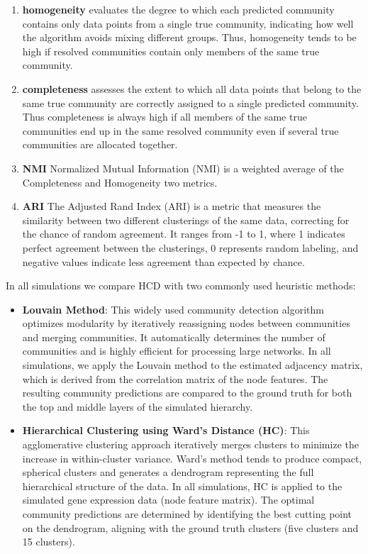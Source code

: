 \documentclass[
]{article}
\begin{document}
\begin{enumerate}
\def\labelenumi{\arabic{enumi}.}
\item
  \textbf{homogeneity} evaluates the degree to which each predicted
  community contains only data points from a single true community,
  indicating how well the algorithm avoids mixing different groups.
  Thus, homogeneity tends to be high if resolved communities contain
  only members of the same true community.
\item
  \textbf{completeness} assesses the extent to which all data points
  that belong to the same true community are correctly assigned to a
  single predicted community. Thus completeness is always high if all
  members of the same true communities end up in the same resolved
  community even if several true communities are allocated together.
\item
  \textbf{NMI} Normalized Mutual Information (NMI) is a weighted average
  of the Completeness and Homogeneity two metrics.
\item
  \textbf{ARI} The Adjusted Rand Index (ARI) is a metric that measures
  the similarity between two different clusterings of the same data,
  correcting for the chance of random agreement. It ranges from -1 to 1,
  where 1 indicates perfect agreement between the clusterings, 0
  represents random labeling, and negative values indicate less
  agreement than expected by chance.
\end{enumerate}

In all simulations we compare HCD with two commonly used heuristic
methods:

\begin{itemize}
\item
  \textbf{Louvain Method}: This widely used community detection
  algorithm optimizes modularity by iteratively reassigning nodes
  between communities and merging communities. It automatically
  determines the number of communities and is highly efficient for
  processing large networks. In all simulations, we apply the Louvain
  method to the estimated adjacency matrix, which is derived from the
  correlation matrix of the node features. The resulting community
  predictions are compared to the ground truth for both the top and
  middle layers of the simulated hierarchy.
\item
  \textbf{Hierarchical Clustering using Ward's Distance (HC)}: This
  agglomerative clustering approach iteratively merges clusters to
  minimize the increase in within-cluster variance. Ward's method tends
  to produce compact, spherical clusters and generates a dendrogram
  representing the full hierarchical structure of the data. In all
  simulations, HC is applied to the simulated gene expression data (node
  feature matrix). The optimal community predictions are determined by
  identifying the best cutting point on the dendrogram, aligning with
  the ground truth clusters (five clusters and 15 clusters).
\end{itemize}
\end{document}
